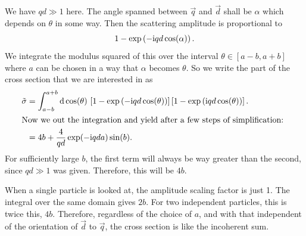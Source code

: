 \documentclass[11pt, english, fleqn, DIV=15, headinclude, BCOR=1.5cm]{scrartcl}
\begin{document}
We have $qd \gg 1$ here. The angle spanned between $\vec q$ and $\vec d$ shall
be $\alpha$ which depends on $\theta$ in some way. Then the scattering
amplitude is proportional to
\[
    1 - \exp\left( -\mathrm i q d \cos(\alpha) \right).
\]
We integrate the modulus squared of this over the interval $\theta \in [a-b,
a+b]$ where $a$ can be chosen in a way that $\alpha$ becomes $\theta$. So we
write the part of the cross section that we are interested in as
\begin{align*}
    \tilde\sigma
    &= \int_{a-b}^{a+b} \dif \cos(\theta) \, \sbr{1 - \exp\del{-\iup qd
    \cos(\theta)}}\sbr{1 - \exp\del{\iup qd \cos(\theta)}}. \\
    \intertext{%
        Now we out the integration and yield after a few steps of
        simplification:
    }
    &= 4b + \frac{4}{qd} \exp(-\iup qda) \sin(b).
\end{align*}
For sufficiently large $b$, the first term will always be way greater than the
second, since $qd \gg 1$ was given. Therefore, this will be $4b$.

When a single particle is looked at, the amplitude scaling factor is just 1.
The integral over the same domain gives $2b$. For two independent particles,
this is twice this, $4b$. Therefore, regardless of the choice of $a$, and with
that independent of the orientation of $\vec d$ to $\vec q$, the cross section
is like the incoherent sum.
\end{document}
